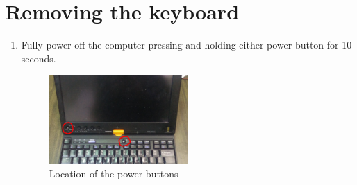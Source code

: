 \documentclass{article}
\begin{document}
\section*{Removing the keyboard}
\begin{enumerate}
	\item Fully power off the computer pressing and holding either power button for 10 seconds.
	\begin{figure}[H]
		\centering
		\includegraphics[width=0.5\textwidth]{powerbutton.jpg}
		\caption{Location of the power buttons}
	\end{figure}


\end{enumerate}
\end{document}
